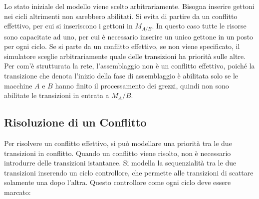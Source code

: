 \documentclass{article}
\numberwithin{equation}{subsection}
\begin{document}
\begin{center}
\end{center}

Lo stato iniziale del modello viene scelto arbitrariamente. Bisogna inserire gettoni nei cicli altrimenti non sarebbero abilitati. Si evita di partire da un conflitto 
effettivo, per cui si inseriscono i gettoni in $M_{A/B}$. In questo caso tutte le risorse sono capacitate ad uno, per cui è necessario inserire un unico gettone in un 
posto per ogni ciclo. Se si parte da un conflitto effettivo, se non viene specificato, il simulatore sceglie arbitrariamente quale delle transizioni ha priorità sulle 
altre. Per com'è strutturata la rete, l'assemblaggio non è un conflitto effettivo, poiché la transizione che denota l'inizio della fase di assemblaggio è abilitata solo se 
le macchine $A$ e $B$ hanno finito il processamento dei grezzi, quindi non sono abilitate le transizioni in entrata a $M_A/B$. 

\subsection{Risoluzione di un Conflitto}

Per risolvere un conflitto effettivo, si può modellare una priorità tra le due transizioni in conflitto. Quando un conflitto viene risolto, non è necessario 
introdurre delle transizioni istantanee. 
Si modella la sequenzialità tra le due transizioni inserendo un ciclo controllore, che permette alle transizioni di scattare solamente una dopo l'altra. Questo 
controllore come ogni ciclo deve essere marcato: 
\end{document}
